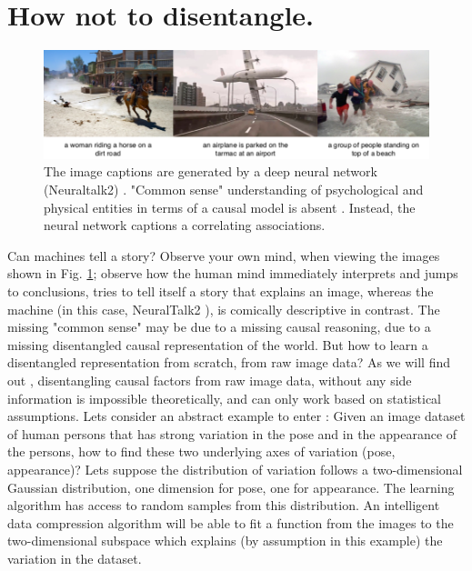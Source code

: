 \section{How not to disentangle.}
	\begin{figure}[t]
		\centering
		\includegraphics[trim={0cm 0cm 0cm 0cm},clip, width=1.\linewidth]{fig/notcausal}
		\caption{The image captions are generated by a deep neural network (Neuraltalk2) \cite{karpathy15neuraltalk}. "Common sense" understanding of psychological and physical entities in terms of a causal model is absent \cite{tenenbaum18think}. Instead, the neural network captions a correlating associations.}
		\label{fig:notcausal}
	\end{figure}
	Can machines tell a story? Observe your own mind, when viewing the images shown in Fig. \ref{fig:notcausal}; observe how the human mind immediately interprets and jumps to conclusions, tries to tell itself a story that explains an image, whereas the machine (in this case, NeuralTalk2 \cite{karpathy15neuraltalk}), is comically descriptive in contrast. 
	The missing "common sense" may be due to a missing causal reasoning, due to a missing disentangled causal representation of the world.
	But how to learn a disentangled representation from scratch, \ie from raw image data?
	As we will find out , disentangling causal factors from raw image data, without any side information is impossible theoretically, and can only work based on statistical assumptions. 
	Lets consider an abstract example to enter :
	Given an image dataset of human persons that has strong variation in the pose and in the appearance of the persons, how to find these two underlying axes of variation (pose, appearance)? Lets suppose the distribution of variation follows a two-dimensional Gaussian distribution, one dimension for pose, one for appearance. The learning algorithm has access to random samples from this distribution. An intelligent data compression algorithm will be able to fit a function from the images to the two-dimensional subspace which explains (by assumption in this example) the variation in the dataset.
